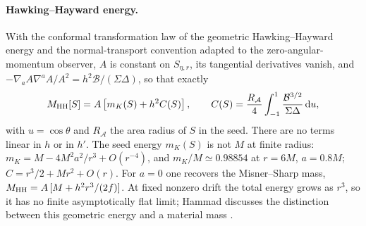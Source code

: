 \documentclass[12pt]{iopart}
\theoremstyle{plain}
\theoremstyle{definition}
\theoremstyle{remark}
\newcommand{\dd}{\mathrm{d}}
\begin{document}
\paragraph{Hawking--Hayward energy.}
With the conformal transformation law of the geometric Hawking--Hayward energy
\cite{Prain2016HH} and the normal-transport convention adapted to the
zero-angular-momentum observer, $A$ is constant on $S_{\eta,r}$, its tangential
derivatives vanish, and $-\nabla_aA\nabla^aA/A^2=h^2\mathcal B/(\Sigma\Delta)$, so that
exactly
\begin{equation}
    M_{\rm HH}[S]=A\left[m_K(S)+h^2C(S)\right],\qquad
    C(S)=\frac{R_{\mathcal A}}{4}\int_{-1}^{1}
         \frac{\mathcal B^{3/2}}{\Sigma\Delta}\,\dd u ,
    \label{eq:hh-tk}
\end{equation}
with $u=\cos\theta$ and $R_{\mathcal A}$ the area radius of $S$ in the seed. There
are no terms linear in $h$ or in $h'$. The seed energy $m_K(S)$ is not $M$ at
finite radius: $m_K=M-4M^2a^2/r^3+O(r^{-4})$, and $m_K/M\simeq0.98854$ at $r=6M$,
$a=0.8M$; $C=r^3/2+Mr^2+O(r)$. For $a=0$ one recovers the Misner--Sharp mass,
$M_{\rm HH}=A\,[M+h^2r^3/(2f)]$. At fixed nonzero drift the total energy grows as
$r^3$, so it has no finite asymptotically flat limit; Hammad discusses the
distinction between this geometric energy and a material mass
\cite{Hammad2016HH}.
\end{document}
